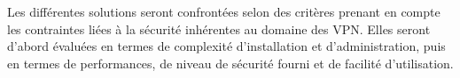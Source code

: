 Les différentes solutions seront confrontées selon des critères prenant en compte les contraintes liées à la sécurité inhérentes au domaine des VPN. Elles seront d'abord évaluées en termes de complexité d'installation et d'administration, puis en termes de performances, de niveau de sécurité fourni et de facilité d'utilisation.

\pagebreak
